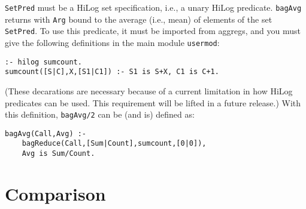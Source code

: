 \begin{description}
    {\tt SetPred} must be a HiLog set specification, i.e., a unary
    HiLog predicate.  {\tt bagAvg} returns with {\tt Arg} bound to the
    average (i.e., mean) of elements of the set {\tt SetPred}.  To use
    this predicate, it must be imported from aggregs, and you must give
    the following definitions in the main module {\tt usermod}:
\begin{verbatim}
:- hilog sumcount.
sumcount([S|C],X,[S1|C1]) :- S1 is S+X, C1 is C+1.
\end{verbatim}
    (These decarations are necessary because of a current limitation in
    how HiLog predicates can be used.  This requirement will be lifted in
    a future release.)  With this definition, {\tt bagAvg/2} can be (and
    is) defined as:
\begin{verbatim}
bagAvg(Call,Avg) :- 
    bagReduce(Call,[Sum|Count],sumcount,[0|0]),
    Avg is Sum/Count.
\end{verbatim}

\end{description}

\section{Comparison} \label{Comparison}


